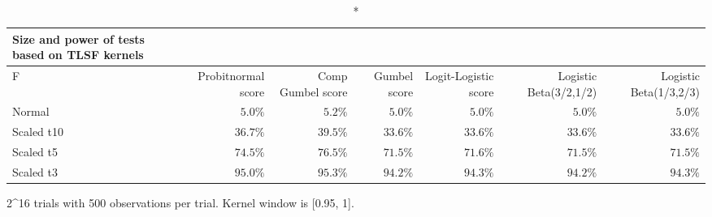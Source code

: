 \setlength{\LTpost}{0mm}
\begin{longtable}{lrrrrrr}
\caption*{
{\large Size and power of tests based on TLSF kernels}
} \\ 
\toprule
F & Probitnormal score & Comp Gumbel score & Gumbel score & Logit-Logistic score & Logistic Beta(3/2,1/2) & Logistic Beta(1/3,2/3) \\ 
\midrule
Normal & $5.0\%$ & $5.2\%$ & $5.0\%$ & $5.0\%$ & $5.0\%$ & $5.0\%$ \\ 
Scaled t10 & $36.7\%$ & $39.5\%$ & $33.6\%$ & $33.6\%$ & $33.6\%$ & $33.6\%$ \\ 
Scaled t5 & $74.5\%$ & $76.5\%$ & $71.5\%$ & $71.6\%$ & $71.5\%$ & $71.5\%$ \\ 
Scaled t3 & $95.0\%$ & $95.3\%$ & $94.2\%$ & $94.3\%$ & $94.2\%$ & $94.3\%$ \\ 
\bottomrule
\end{longtable}
\begin{minipage}{\linewidth}
2\textasciicircum{}16 trials with 500 observations per trial.  Kernel window is [0.95, 1].\\
\end{minipage}

